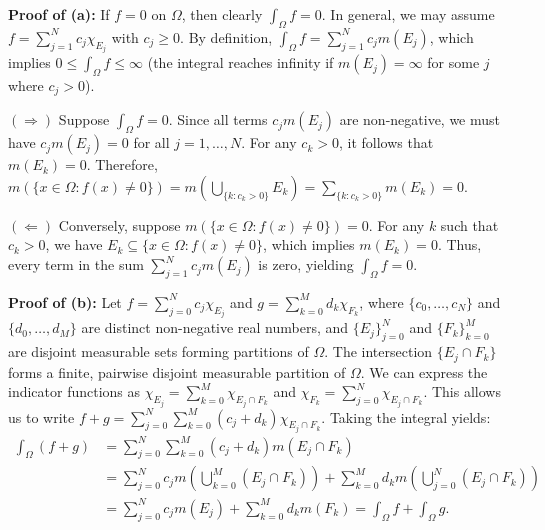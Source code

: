 \begin{pfbox}
    \textbf{Proof of (a):} If $f=0$ on $\Omega$, then clearly $\int_\Omega f = 0$. In general, we may assume $f = \displaystyle\sum_{j=1}^N c_j \chi_{E_j}$ with $c_j \ge 0$. By definition, $\int_\Omega f = \displaystyle\sum_{j=1}^N c_j m(E_j)$, which implies $0 \le \int_\Omega f \le \infty$ (the integral reaches infinity if $m(E_j) = \infty$ for some $j$ where $c_j > 0$).
    
    $(\Rightarrow)$ Suppose $\int_\Omega f = 0$. Since all terms $c_j m(E_j)$ are non-negative, we must have $c_j m(E_j) = 0$ for all $j=1,\dots,N$. For any $c_k > 0$, it follows that $m(E_k) = 0$. Therefore, $m(\{x \in \Omega : f(x) \neq 0\}) = m\left(\displaystyle\bigcup_{\{k: c_k > 0\}} E_k\right) = \displaystyle\sum_{\{k: c_k > 0\}} m(E_k) = 0$.
    
    $(\Leftarrow)$ Conversely, suppose $m(\{x \in \Omega : f(x) \neq 0\}) = 0$. For any $k$ such that $c_k > 0$, we have $E_k \subseteq \{x \in \Omega : f(x) \neq 0\}$, which implies $m(E_k) = 0$. Thus, every term in the sum $\displaystyle\sum_{j=1}^N c_j m(E_j)$ is zero, yielding $\int_\Omega f = 0$.

    \textbf{Proof of (b):} Let $f = \displaystyle\sum_{j=0}^N c_j \chi_{E_j}$ and $g = \displaystyle\sum_{k=0}^M d_k \chi_{F_k}$, where $\{c_0, \dots, c_N\}$ and $\{d_0, \dots, d_M\}$ are distinct non-negative real numbers, and $\{E_j\}_{j=0}^N$ and $\{F_k\}_{k=0}^M$ are disjoint measurable sets forming partitions of $\Omega$.
    The intersection $\{E_j \cap F_k\}$ forms a finite, pairwise disjoint measurable partition of $\Omega$. We can express the indicator functions as $\chi_{E_j} = \displaystyle\sum_{k=0}^M \chi_{E_j \cap F_k}$ and $\chi_{F_k} = \displaystyle\sum_{j=0}^N \chi_{E_j \cap F_k}$.
    This allows us to write $f + g = \displaystyle\sum_{j=0}^N \displaystyle\sum_{k=0}^M (c_j + d_k) \chi_{E_j \cap F_k}$.
    Taking the integral yields:
    \begin{align*}
        \int_\Omega (f+g) &= \displaystyle\sum_{j=0}^N \displaystyle\sum_{k=0}^M (c_j + d_k) m(E_j \cap F_k) \\
        &= \displaystyle\sum_{j=0}^N c_j m\left(\displaystyle\bigcup_{k=0}^M (E_j \cap F_k)\right) + \displaystyle\sum_{k=0}^M d_k m\left(\displaystyle\bigcup_{j=0}^N (E_j \cap F_k)\right) \\
        &= \displaystyle\sum_{j=0}^N c_j m(E_j) + \displaystyle\sum_{k=0}^M d_k m(F_k) = \int_\Omega f + \int_\Omega g.
    \end{align*}


\end{pfbox}
